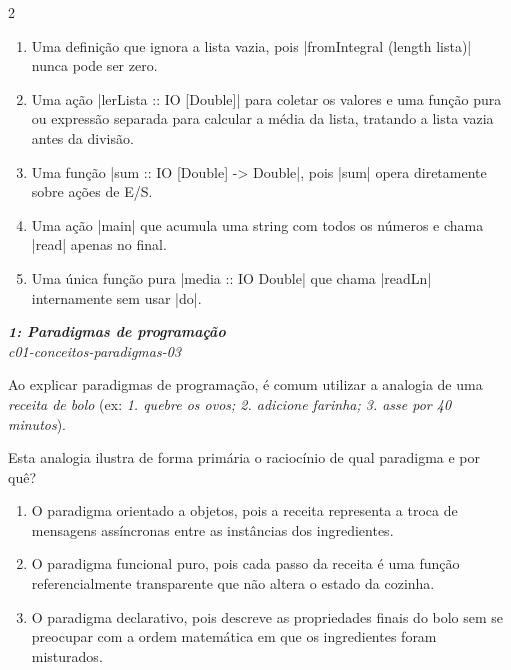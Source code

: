 \documentclass[a4paper,10pt,brazil]{article}
\begin{document}
\begin{multicols}{2}
\begin{enumerate}
  \item Uma definição que ignora a lista vazia, pois \haskellinline|fromIntegral (length lista)| nunca pode ser zero.

  \item Uma ação \haskellinline|lerLista :: IO [Double]| para coletar os valores e uma função pura ou expressão separada para calcular a média da lista, tratando a lista vazia antes da divisão.

  \item Uma função \haskellinline|sum :: IO [Double] -> Double|, pois \haskellinline|sum| opera diretamente sobre ações de E/S.

  \item Uma ação \haskellinline|main| que acumula uma string com todos os números e chama \haskellinline|read| apenas no final.

  \item Uma única função pura \haskellinline|media :: IO Double| que chama \haskellinline|readLn| internamente sem usar \haskellinline|do|.


\end{enumerate}

\begin{flushright}
  \footnotesize
  \textit{\textbf{1: Paradigmas de programação}}\\
  \textit{c01-conceitos-paradigmas-03}\\

\end{flushright}
Ao explicar paradigmas de programação, é comum utilizar a analogia de uma \emph{receita de bolo} (ex: \emph{1. quebre os ovos; 2. adicione farinha; 3. asse por 40 minutos}). 

Esta analogia ilustra de forma primária o raciocínio de qual paradigma e por quê?

\begin{enumerate}
  \item O paradigma orientado a objetos, pois a receita representa a troca de mensagens assíncronas entre as instâncias dos ingredientes.

  \item O paradigma funcional puro, pois cada passo da receita é uma função referencialmente transparente que não altera o estado da cozinha.

  \item O paradigma declarativo, pois descreve as propriedades finais do bolo sem se preocupar com a ordem matemática em que os ingredientes foram misturados.


\end{enumerate}
\end{multicols}
\end{document}
